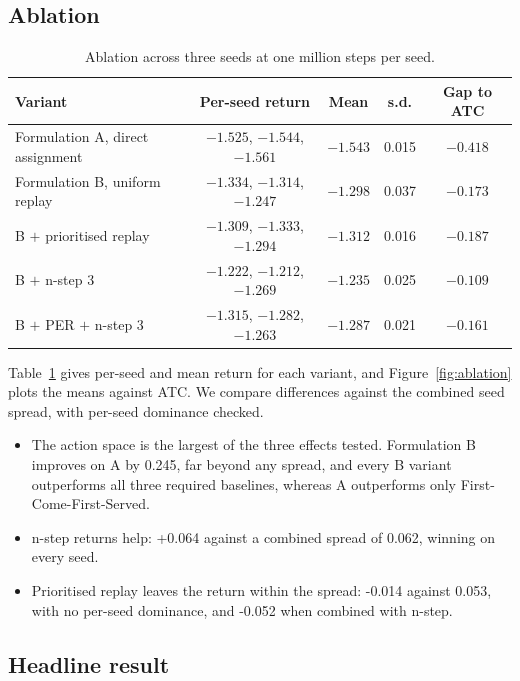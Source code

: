 \subsection{Ablation}\label{ablation}

{\def\LTcaptype{none} %
\begin{table}[t]
\centering\small
\caption{Ablation across three seeds at one million steps per seed.}
\label{tab:ablation}
\begin{tabular}{lcccc}
\toprule
Variant & Per-seed return & Mean & s.d. & Gap to ATC \\
\midrule
Formulation A, direct assignment & $-1.525$, $-1.544$, $-1.561$ & $-1.543$ & 0.015 & $-0.418$ \\
Formulation B, uniform replay    & $-1.334$, $-1.314$, $-1.247$ & $-1.298$ & 0.037 & $-0.173$ \\
B $+$ prioritised replay         & $-1.309$, $-1.333$, $-1.294$ & $-1.312$ & 0.016 & $-0.187$ \\
B $+$ n-step 3                   & $-1.222$, $-1.212$, $-1.269$ & $-1.235$ & 0.025 & $-0.109$ \\
B $+$ PER $+$ n-step 3           & $-1.315$, $-1.282$, $-1.263$ & $-1.287$ & 0.021 & $-0.161$ \\
\bottomrule
\end{tabular}
\end{table}

}

Table~\ref{tab:ablation} gives per-seed and mean return for each variant, and
Figure~\ref{fig:ablation} plots the means against ATC. We compare differences against the
combined seed spread, with per-seed dominance checked.

\begin{itemize}
\item
  The action space is the largest of the three effects tested. Formulation B improves on A by
  0.245, far beyond any spread, and every B variant outperforms all three required baselines,
  whereas A outperforms only First-Come-First-Served.
\item
  n-step returns help: +0.064 against a combined spread of 0.062, winning on every seed.
\item
  Prioritised replay leaves the return within the spread: -0.014 against 0.053, with no per-seed
dominance, and -0.052 when combined with n-step.
\end{itemize}

\subsection{Headline result}\label{headline-result}

